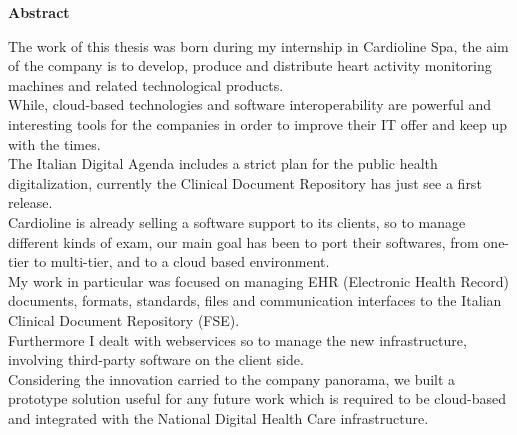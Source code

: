 \thispagestyle{empty}
  \begin{center}
    {\bf \Huge Abstract}
  \end{center}

  \vspace{4cm}
  
  The work of this thesis was born during my internship in Cardioline Spa, the aim of the company is to develop, produce and distribute heart activity monitoring machines and related technological products.\\While, cloud-based technologies and software interoperability are powerful and interesting tools for the companies in order to improve their IT offer and keep up with the times.\\The Italian Digital Agenda includes a strict plan for the public health digitalization, currently the Clinical Document Repository has just see a first release.\\Cardioline is already selling a software support to its clients, so to manage different kinds of exam, our main goal has been to port their softwares, from one-tier to multi-tier, and to a cloud based environment.\\My work in particular was focused on managing EHR (Electronic Health Record) documents, formats, standards, files and communication interfaces to the Italian Clinical Document Repository (FSE).\\Furthermore I dealt with webservices so to manage the new infrastructure, involving third-party software on the client side.\\Considering the innovation carried to the company panorama, we built a prototype solution useful for any future work which is required to be cloud-based and integrated with the National Digital Health Care infrastructure.